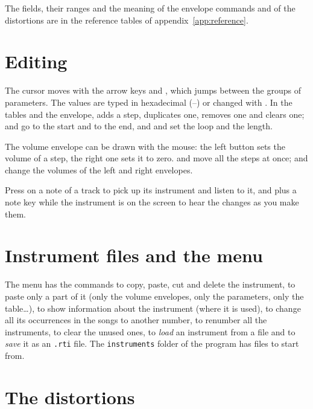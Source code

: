 The fields, their ranges and the meaning of the envelope commands and of the distortions are in the reference tables of
appendix~\ref{app:reference}.

\section{Editing}

The cursor moves with the arrow keys and , which jumps between the groups of parameters. The values are typed in hexadecimal
(--) or changed with . In the tables and the envelope,  adds a step,
 duplicates one,  removes one and  clears one;  and  go to the start and to
the end, and  and  set the loop and the length.

The volume envelope can be drawn with the mouse: the left button sets the volume of a step, the right one sets it to zero.
 and  move all the steps at once;  and \key{-} change the volumes of the left and
right envelopes.

\begin{tip}
Press  on a note of a track to pick up its instrument and listen to it, and  plus a note key while the
instrument is on the screen to hear the changes as you make them.
\end{tip}

\section{Instrument files and the  menu}

The  menu has the commands to copy, paste, cut and delete the instrument, to paste only a part of it (only the
volume envelopes, only the parameters, only the table\ldots), to show information about the instrument (where it is used), to change all its occurrences in the songs to another number, to renumber all the instruments, to clear the unused
ones, to \emph{load} an instrument from a file and to \emph{save} it as an \texttt{.rti} file.
The \texttt{instruments} folder of the program has files to start from.

\section{The distortions}

